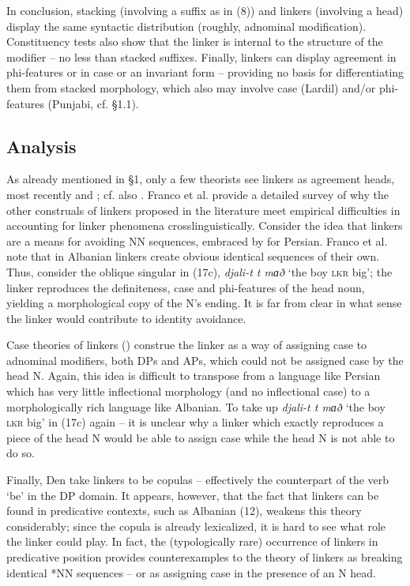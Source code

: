 \documentclass[output=paper]{langsci/langscibook}
\begin{document}
In conclusion, stacking (involving a suffix as in (8)) and linkers (involving a head) display the same syntactic distribution (roughly, adnominal modification). Constituency tests also show that the linker is internal to the structure of the modifier – no less than stacked suffixes. Finally, linkers can display agreement in phi-features or in case or an invariant form – providing no basis for differentiating them from stacked morphology, which also may involve case (Lardil) and/or phi-features (Punjabi, cf. §1.1).

\subsection{Analysis}

As already mentioned in §1, only a few theorists see linkers as agreement heads, most recently \citet{Philip2012} and \citet{FrancoEtAl2015}; cf. also \citet{Zwart2006}. Franco et al. provide a detailed survey of why the other construals of linkers proposed in the literature meet empirical difficulties in accounting for linker phenomena crosslinguistically. Consider the idea that linkers are a means for avoiding NN sequences, embraced by \citet{Richards2010} for Persian. Franco et al. note that in Albanian linkers create obvious identical sequences of their own. Thus, consider the oblique singular in (17c), \textit{djali-t t mɑð} ‘the boy \textsc{lkr} big’; the linker reproduces the definiteness, case and phi-features of the head noun, yielding a morphological copy of the N’s ending. It is far from clear in what sense the linker would contribute to identity avoidance.

  Case theories of linkers (\citealt{Larson2008}) construe the linker as a way of assigning case to adnominal modifiers, both DPs and APs, which could not be assigned case by the head N. Again, this idea is difficult to transpose from a language like Persian which has very little inflectional morphology (and no inflectional case) to a morphologically rich language like Albanian. To take up \textit{djali-t t mɑð} ‘the boy \textsc{lkr} big’ in (17c) again – it is unclear why a linker which exactly reproduces a piece of the head N would be able to assign case while the head N is not able to do so.    

  Finally, Den \citet{Dikken2004} take linkers to be copulas – effectively the counterpart of the verb ‘be’ in the DP domain. It appears, however, that the fact that linkers can be found in predicative contexts, such as Albanian (12), weakens this theory considerably; since the copula is already lexicalized, it is hard to see what role the linker could play. In fact, the (typologically rare) occurrence of linkers in predicative position provides counterexamples to the theory of linkers as breaking identical *NN sequences – or as assigning case in the presence of an N head. 
\end{document}
